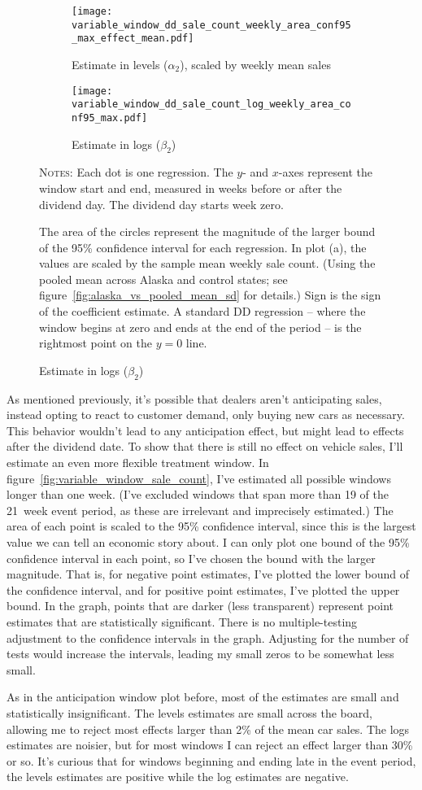 \documentclass[11pt,letterpaper,oneside]{article}
\newcommand{\varWindowDDnotes}{%
Each dot is one regression.
The $y$- and $x$-axes represent the window start and end, measured in weeks before or after the dividend day.
The dividend day starts week zero.

 The area of the circles represent the magnitude of the larger bound of the 95\% confidence interval for each regression.
In plot (a), the values are scaled by the sample mean weekly sale count.
(Using the pooled mean across Alaska and control states; see figure~\ref{fig:alaska_vs_pooled_mean_sd} for details.)
Sign is the sign of the coefficient estimate. %
A standard DD regression -- where the window begins at zero and ends at the end of the period -- is the rightmost point on the $y=0$ line.
}
\begin{document}
\begin{doublespacing}
\begin{figure}[!hbtp]
    \caption{Sales count effects with varying windows}
    \label{fig:variable_window_sale_count}
    \begin{subfigure}{0.97\linewidth}
        \caption{Estimate in levels ($\alpha_2$), scaled by weekly mean sales}
        \centering
        \texttt{[image: variable\_window\_dd\_sale\_count\_weekly\_area\_conf95\_max\_effect\_mean.pdf]}
    \end{subfigure}
    \begin{subfigure}{0.97\linewidth}
        \caption{Estimate in logs ($\beta_2$)}
        \texttt{[image: variable\_window\_dd\_sale\_count\_log\_weekly\_area\_conf95\_max.pdf]}
    \end{subfigure}

    {\footnotesize
    \textsc{Notes:}
    \varWindowDDnotes
    }
\end{figure}

As mentioned previously, it's possible that dealers aren't anticipating sales, instead opting to react to customer demand, only buying new cars as necessary.
This behavior wouldn't lead to any anticipation effect, but might lead to effects after the dividend date.
To show that there is still no effect on vehicle sales, I'll estimate an even more flexible treatment window.
In figure~\ref{fig:variable_window_sale_count}, I've estimated all possible windows longer than one week.
(I've excluded windows that span more than 19 of the 21~week event period, as these are irrelevant and imprecisely estimated.)
The area of each point is scaled to the 95\% confidence interval, since this is the largest value we can tell an economic story about.
I can only plot one bound of the 95\% confidence interval in each point, so I've chosen the bound with the larger magnitude.
That is, for negative point estimates, I've plotted the lower bound of the confidence interval, and for positive point estimates, I've plotted the upper bound.
In the graph, points that are darker (less transparent) represent point estimates that are statistically significant.
There is no multiple\hyp{}testing adjustment to the confidence intervals in the graph.
Adjusting for the number of tests would increase the intervals, leading my small zeros to be somewhat less small.

As in the anticipation window plot before, most of the estimates are small and statistically insignificant.
The levels estimates are small across the board, allowing me to reject most effects larger than 2\% of the mean car sales.
The logs estimates are noisier, but for most windows I can reject an effect larger than 30\% or so.
It's curious that for windows beginning and ending late in the event period, the levels estimates are positive while the log estimates are negative.


\end{doublespacing}
\end{document}

